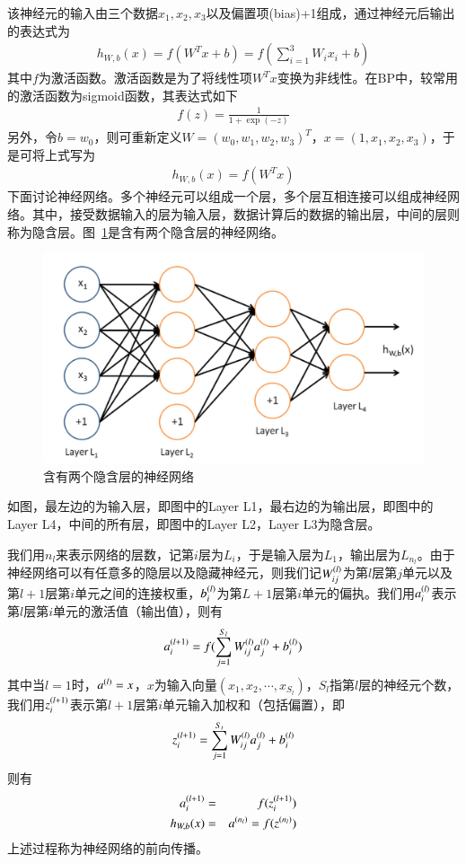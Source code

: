该神经元的输入由三个数据$x_1,x_2,x_3$以及偏置项(bias)+1组成，通过神经元后输出的表达式为
\begin{eqnarray}
h_{W,b}(x)=f(W^Tx+b)=f(\sum_{i=1}^3 W_ix_i+b)
\end{eqnarray}
其中$f$为激活函数。激活函数是为了将线性项$W^Tx$变换为非线性。在BP中，较常用的激活函数为sigmoid函数，其表达式如下
\begin{eqnarray}
f(z)=\frac{1}{1+\exp(-z)}
\end{eqnarray}
另外，令$b=w_0$，则可重新定义$W=(w_0,w_1,w_2,w_3)^T$，$x=(1,x_1,x_2,x_3)$，于是可将上式写为
\begin{eqnarray}
h_{W,b}(x)=f(W^Tx)
\end{eqnarray}
下面讨论神经网络。多个神经元可以组成一个层，多个层互相连接可以组成神经网络。其中，接受数据输入的层为输入层，数据计算后的数据的输出层，中间的层则称为隐含层。图~\ref{fig:bp2}是含有两个隐含层的神经网络。
\begin{figure}[htb]
\centering
\includegraphics[scale=0.5]{../figures/NN2.png}
\caption{含有两个隐含层的神经网络}
\label{fig:bp2}
\end{figure}
如图，最左边的为输入层，即图中的Layer L1，最右边的为输出层，即图中的Layer L4，中间的所有层，即图中的Layer L2，Layer L3为隐含层。

我们用$n_l$来表示网络的层数，记第$i$层为$L_i$，于是输入层为$L_1$，输出层为$L_{n_l}$。由于神经网络可以有任意多的隐层以及隐藏神经元，则我们记$\samplet{W}{l}{ij}$为第$l$层第$j$单元以及第$l+1$层第$i$单元之间的连接权重，$\samplet{b}{l}{i	}$为第$L+1$层第$i$单元的偏执。我们用$\samplet{a}{l}{i}$表示第$l$层第$i$单元的激活值（输出值），则有
\begin{eqnarray}
\samplet{a}{l+1}{i}=f(\sum_{j=1}^{S_l}\samplet{W}{l}{ij}\samplet{a}{l}{j}+\samplet{b}{l}{i})
\end{eqnarray}
其中当$l=1$时，$\sample{a}{l}=x$，$x$为输入向量$(x_1,x_2,\cdots,x_{S_l})$，$S_l$指第$l$层的神经元个数，我们用$\samplet{z}{l+1}{i}$表示第$l+1$层第$i$单元输入加权和（包括偏置），即
\begin{eqnarray}
\samplet{z}{l+1}{i}=\sum_{j=1}^{S_t}\samplet{W}{l}{ij}\samplet{a}{l}{j}+\samplet{b}{l}{i}
\end{eqnarray}
则有
\begin{eqnarray}
\samplet{a}{l+1}{i}&=&f(\samplet{z}{l+1}{i})\\
h_{W,b}(x)&=&\sample{a}{n_l}=f(\sample{z}{n_l})
\end{eqnarray}
上述过程称为神经网络的前向传播。

